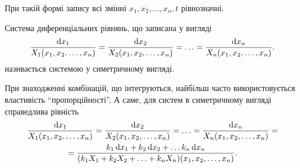 При такій формі запису всі змінні $x_1, x_2, \ldots, x_n, t$ рівнозначні. \parvskip

Система диференціальних рівнянь, що записана у вигляді
\begin{equation*}
	\frac{\mathop{}\!\mathrm{d} x_1}{X_1(x_1, x_2, \ldots, x_n)} = \frac{\mathop{}\!\mathrm{d} x_2}{X_2 (x_1, x_2, \ldots, x_n)} = \ldots = \frac{\mathop{}\!\mathrm{d} x_n}{X_n (x_1, x_2, \ldots, x_n)}.
\end{equation*}
називається системою у симетричному вигляді. \parvskip

При знаходженні комбінацій, що інтегруються, найбільш часто використовується властивість ``пропорційності''. А саме, для систем в симетричному вигляді справедлива рівність
\begin{multline*}
	\frac{\mathop{}\!\mathrm{d} x_1}{X_1(x_1, x_2, \ldots, x_n)} = \frac{\mathop{}\!\mathrm{d} x_2}{X_2 (x_1, x_2, \ldots, x_n)} = \ldots = \frac{\mathop{}\!\mathrm{d} x_n}{X_n (x_1, x_2, \ldots, x_n)} = \\
	= \frac{k_1 \mathop{}\!\mathrm{d} x_1 + k_2 \mathop{}\!\mathrm{d} x_2 + \ldots k_n \mathop{}\!\mathrm{d} x_n}{(k_1 X_1  + k_2 X_2  + \ldots + k_n X_n) (x_1, x_2, \ldots, x_n)}.
\end{multline*}
